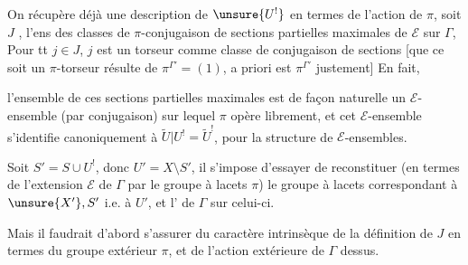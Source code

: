 On récupère déjà une description de \(\unsure{U^!}\) en termes de
l'action de \(\pi\), soit \(J\) ,
l'ens des classes de \(\pi\)-conjugaison
de sections partielles  maximales de
\(\mathcal E\) sur \(\Gamma\),
Pour tt \(j\in J\), \(j\) est un \inserted{\(\pi\)-}torseur
comme
classe de \inserted{\(\pi\)-}conjugaison de sections
[que ce soit un \(\pi\)-torseur résulte de
\(\pi^{\Gamma'}=(1)\), a priori
est \(\pi^{\Gamma'}\) justement]
En fait,



l'ensemble de  ces  sections
partielles maximales est de façon naturelle un \(\mathcal E\)-ensemble
(par conjugaison)  sur lequel \(\pi\) opère librement, et cet
\(\mathcal E\)-ensemble s'identifie canoniquement à
\(\widetilde U|U^!=\widetilde U^!\), pour la structure de
\(\mathcal E\)-ensembles.

Soit \(S'=S\cup U^!\), donc \(U'=X\setminus S'\),
il s'impose d'essayer de reconstituer
(en termes de l'extension \(\mathcal E\) de \(\Gamma\) par le groupe à
lacets \(\pi\)) le groupe  à lacets correspondant
à \(\unsure{X'},S'\) i.e. à \(U'\), et l'
 de \(\Gamma\) sur celui-ci.

Mais il faudrait d'abord s'assurer du caractère intrinsèque de la
définition de \(J\) 
en termes du  
groupe extérieur \(\pi\), et de l'action
 extérieure de \(\Gamma\) dessus.



